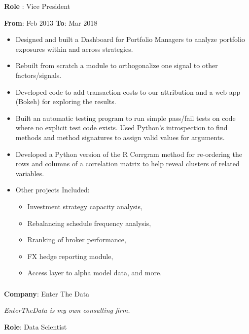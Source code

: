\documentclass[
]{article}
\providecommand{\tightlist}{%
  \setlength{\itemsep}{0pt}\setlength{\parskip}{0pt}}
\begin{document}
\begin{flushleft}
\textbf{Role} : Vice President
\end{flushleft}

\textbf{From}: Feb 2013 \hspace{0.5in}  \textbf{To}: Mar 2018\\

\begin{itemize}
\tightlist
\item
  Designed and built a Dashboard for Portfolio Managers to analyze
  portfolio exposures within and across strategies.
\item
  Rebuilt from scratch a module to orthogonalize one signal to other
  factors/signals.
\item
  Developed code to add transaction costs to our attribution and a web
  app (Bokeh) for exploring the results.
\item
  Built an automatic testing program to run simple pass/fail tests on
  code where no explicit test code exists. Used Python's introspection
  to find methods and method signatures to assign valid values for
  arguments.
\item
  Developed a Python version of the R Corrgram method for re-ordering
  the rows and columns of a correlation matrix to help reveal clusters
  of related variables.
\item
  Other projects Included:

  \begin{itemize}
  \tightlist
  \item
    Investment strategy capacity analysis,
  \item
    Rebalancing schedule frequency analysis,
  \item
    Rranking of broker performance,
  \item
    FX hedge reporting module,
  \item
    Access layer to alpha model data, and more.
  \end{itemize}
\end{itemize}

\hypertarget{enterthedata}{\subsubsection{}\label{enterthedata}}
\begin{flushleft}
\textbf{Company}: Enter The Data
\end{flushleft}
{\hspace{.1in} \footnotesize \emph{EnterTheData is my own consulting firm.}}
\begin{flushleft}
\textbf{Role}: Data Scientist
\end{flushleft}
\end{document}
